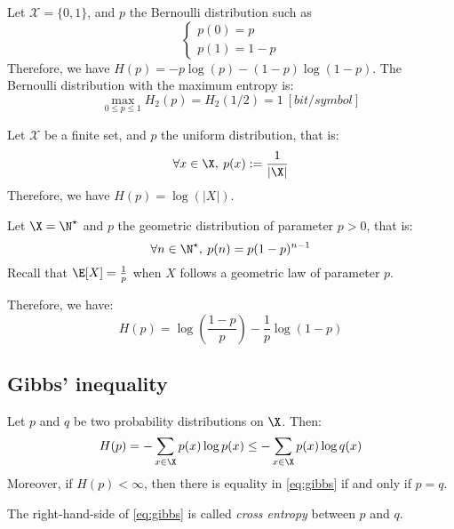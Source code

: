 \documentclass[toc]{../cs-classes/cs-classes}
\begin{document}
\begin{example}
    Let $\mathcal{X}=\{0, 1\}$, and $p$ the Bernoulli distribution such as
    \begin{equation*}
        \begin{cases}
            p(0) = p\\
            p(1) = 1 - p
        \end{cases}
    \end{equation*}
    Therefore, we have $H(p)=-p\log(p) - (1-p)\log(1-p)$. The Bernoulli distribution with the maximum entropy is:
    \begin{equation*}
        \max_{0\leq p\leq 1} H_2(p) = H_2(1/2) = 1 \: [bit/symbol]
    \end{equation*}
\end{example}

\begin{example}
    Let $\mathcal{X}$ be a finite set, and $p$ the uniform distribution, that is:
    \begin{equation*}
        \forall x\in \X, \: p(x) := \frac{1}{|\X|}
    \end{equation*}
    Therefore, we have $H(p) = \log(|X|)$.
\end{example}

\begin{example}
    Let $\X = \N^\star$ and $p$ the geometric distribution of parameter $p>0$, that is:
    \begin{equation*}
        \forall n\in \N^\star, \: p(n) = p(1-p)^{n-1}
    \end{equation*}
    Recall that $\E[X] = \frac{1}{p}$ when $X$ follows a geometric law of parameter $p$.

    Therefore, we have:
    \begin{equation*}
        H(p) = \log\left(\frac{1-p}{p}\right) - \frac{1}{p}\log(1-p)
    \end{equation*}
\end{example}

\subsection{Gibbs' inequality}
\begin{theorem}
    Let $p$ and $q$ be two probability distributions on $\X$. Then:
    \begin{equation}
        \label{eq:gibbs}
        H(p) = -\sum_{x\in\X} p(x)\log p(x)  \leq - \sum_{x\in\X} p(x)\log q(x)
    \end{equation}
    Moreover, if $H(p)<\infty$, then there is equality in \eqref{eq:gibbs} if and only if $p=q$.
\end{theorem}
The right-hand-side of \eqref{eq:gibbs} is called \emph{cross entropy} between $p$ and $q$.
\end{document}
